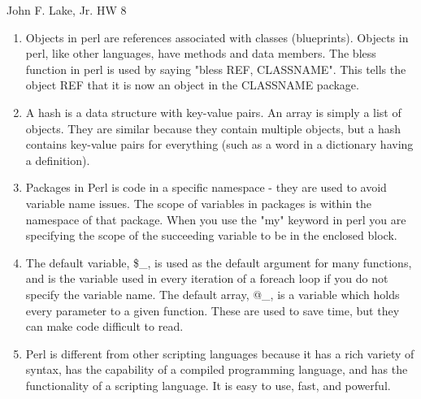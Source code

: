 \documentclass{article}
\begin{document}
John F. Lake, Jr. HW 8

\begin{enumerate}
\item Objects in perl are references associated with classes (blueprints).  Objects in perl, like other languages, have methods and data members.  The bless function in perl is used by saying "bless REF, CLASSNAME".  This tells the object REF that it is now an object in the CLASSNAME package. 
\item A hash is a data structure with key-value pairs.  An array is simply a list of objects.  They are similar because they contain multiple objects, but a hash contains key-value pairs for everything (such as a word in a dictionary having a definition).  
\item Packages in Perl is code in a specific namespace - they are used to avoid variable name issues.  The scope of variables in packages is within the namespace of that package.  When you use the "my" keyword in perl you are specifying the scope of the succeeding variable to be in the enclosed block.  
\item The default variable, \$\_, is used as the default argument for many functions, and is the variable used in every iteration of a foreach loop if you do not specify the variable name.  The default array, @\_, is a variable which holds every parameter to a given function.  These are used to save time, but they can make code difficult to read.   
\item Perl is different from other scripting languages because it has a rich variety of syntax, has the capability of a compiled programming language, and has the functionality of a scripting language. It is easy to use, fast, and powerful.  
\end{enumerate}
\end{document}
